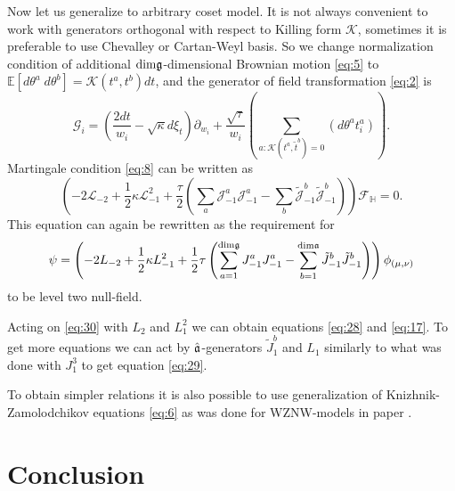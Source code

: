 Now let us generalize to arbitrary coset model. It is not always convenient to work with generators orthogonal with respect to Killing form $\mathcal{K}$, sometimes it is preferable to use Chevalley or Cartan-Weyl basis. So we change normalization condition of additional $\mathrm{dim}\mathfrak{g}$-dimensional Brownian motion \eqref{eq:5} to $\mathbb{E}\left[d\theta^{a}\; d\theta^{b}\right]=\mathcal{K}(t^{a},t^{b})dt$, and the generator of field transformation \eqref{eq:2} is
\begin{equation*}
  \mathcal{G}_{i}=\left(\frac{2dt}{w_{i}}-\sqrt{\kappa} d\xi_{t}\right) \partial_{w_{i}}+\frac{\sqrt{\tau}}{w_{i}}\left(\sum_{a:\mathcal{K}(t^{a},\tilde{t}^{b})=0}\left(d \theta ^{a} t^{a}_{i}\right)\right).
\end{equation*}
 Martingale condition  \eqref{eq:8} can be written as
\begin{equation*}
  \left(-2 \mathcal{L}_{-2}+\frac{1}{2}\kappa \mathcal{L}_{-1}^{2}+\frac{\tau}{2}\left( \sum_{a} \mathcal{J}^{a}_{-1} \mathcal{J}^{a}_{-1}-
      \sum_{b}\tilde{\mathcal{J}}^{b}_{-1} \tilde{\mathcal{J}}^{b}_{-1}\right)\right)        \mathcal{F}_{\mathbb{H}}=0.
\end{equation*}
This equation can again be rewritten as the requirement for
\begin{equation}
  \psi=\left(-2L_{-2}+\frac{1}{2}\kappa L_{-1}^{2}+\frac{1}{2}\tau \left(\sum_{a=1}^{\mathrm{dim}\mathfrak{g}}J^{a}_{-1}J^{a}_{-1}-\sum_{b=1}^{\mathrm{dim}\mathfrak{a}}\tilde{J}^{b}_{-1}\tilde{J}^{b}_{-1}\right)\right) \phi_{(\mu,\nu)}
\label{eq:30}
\end{equation}
to be level two null-field.

Acting on \eqref{eq:30} with $L_{2}$ and $L_{1}^{2}$ we can obtain equations \eqref{eq:28} and \eqref{eq:17}. To get more equations we can act by $\hat{\mathfrak{a}}$-generators $\tilde{J}^{b}_{1}$ and $L_{1}$ similarly to what was done with $J^{3}_{1}$ to get equation \eqref{eq:29}. 

To obtain simpler relations it is also possible to use generalization of Knizhnik-Zamolodchikov equations \eqref{eq:6} as was done for WZNW-models in paper \cite{alekseev2010sle}. 

\section{Conclusion}
\label{sec:conclusion}

